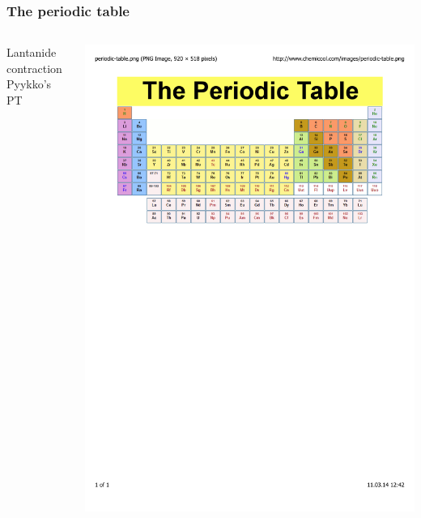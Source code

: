 \documentclass[mathserif,10pt]{beamer}
\begin{document}
\begin{frame}
    \frametitle{The periodic table}
    \begin{columns}
    \begin{column}{.40\textwidth}
	Lantanide contraction\\
	Pyykko's PT
    \end{column}
    \begin{column}{.60\textwidth}
	\centering
	\includegraphics[viewport = 0 500 550 800, clip, scale=0.3]{figures/periodic_table.pdf}
    \end{column}
    \end{columns}
\end{frame}
\end{document}
